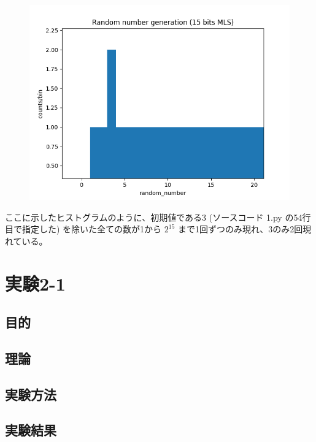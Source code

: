 \documentclass[xelatex,ja=standard]{bxjsarticle}
\begin{document}
\begin{figure}[htbp]
    \centering
    \includegraphics[scale=1]
{3-2.png}
    \label{fig:1}
\end{figure}


ここに示したヒストグラムのように、初期値である3 (ソースコード 1.py の54行目で指定した) を除いた全ての数が1から $2^{15}$ まで1回ずつのみ現れ、3のみ2回現れている。


\section{実験2-1}

\subsection{目的}
\subsection{理論}
\subsection{実験方法}
\subsection{実験結果}
\end{document}

